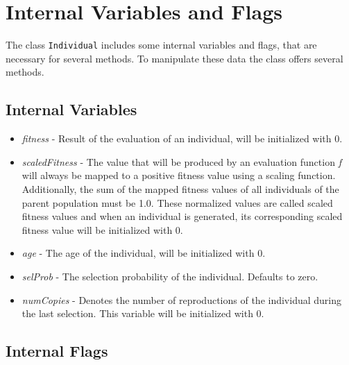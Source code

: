 \section{Internal Variables and Flags}

The class {\tt Individual} includes some internal variables and flags, that
are necessary for several methods.
To manipulate these data the class offers several methods.

\subsection{Internal Variables}

\begin{itemize}
\item {\em fitness} -
Result of the evaluation of an individual, will be initialized with
0.

\item {\em scaledFitness} -
The value that will be produced by an evaluation function {\em f}
will always be mapped to a positive fitness value using a
scaling function. Additionally, the sum of the mapped fitness values of all
individuals of the parent population must be 1.0.
These normalized values are called scaled fitness values and when an
individual is generated, its corresponding scaled fitness value will be
initialized with 0.

\item {\em age} -
The age of the individual, will be initialized with 0.

\item {\em selProb} - 
The selection probability of the individual. Defaults to zero. 

\item {\em numCopies} -
Denotes the number of reproductions of the individual
during the last selection. This variable will be initialized
with 0.
\end{itemize}

\clearpage

\subsection{Internal Flags}

